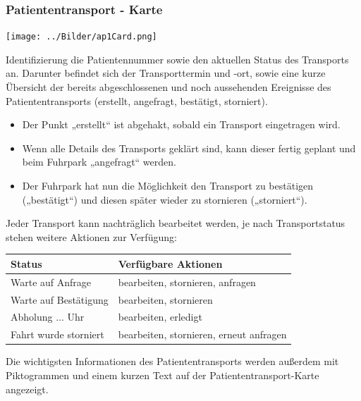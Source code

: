 \documentclass[a4paper, ngerman, 12pt]{scrartcl}
\begin{document}
\subsubsection{Patiententransport - Karte}
\begin{center}
\begin{minipage}{0.8\textwidth}
	\centering
	\texttt{[image: ../Bilder/ap1Card.png]}
	\label{img:ap1card}
\end{minipage}
\end{center}
Identifizierung die Patientennummer sowie den aktuellen Status des Transports an. Darunter befindet sich der Transporttermin und -ort, sowie eine kurze Übersicht der bereits abgeschlossenen und noch aussehenden Ereignisse des Patiententransports (erstellt, angefragt, bestätigt, storniert).\\
\begin{itemize}
\item Der Punkt „erstellt“ ist abgehakt, sobald ein Transport eingetragen wird.
\item Wenn alle Details des Transports geklärt sind, kann dieser fertig geplant und beim Fuhrpark „angefragt“ werden.
\item Der Fuhrpark hat nun die Möglichkeit den Transport zu bestätigen („bestätigt“) und diesen später wieder zu stornieren („storniert“).
\end{itemize}
Jeder Transport kann nachträglich bearbeitet werden, je nach Transportstatus stehen weitere Aktionen zur Verfügung:\\
\begin{center}
\begin{tabular}{|p{}|p{}|}
\hline
\cellcolor{lightgray}\textbf{Status}	&\cellcolor{lightgray}\textbf{Verfügbare Aktionen}\\
\hline
Warte auf Anfrage	&bearbeiten, stornieren, anfragen\\
\hline
Warte auf Bestätigung	&bearbeiten, stornieren\\
\hline
Abholung ... Uhr	&bearbeiten, erledigt\\
\hline
Fahrt wurde storniert	&bearbeiten, stornieren, erneut anfragen\\
\hline
\end{tabular}
\end{center}
Die wichtigsten Informationen des Patiententransports werden außerdem mit Piktogrammen und einem kurzen Text auf der Patiententransport-Karte angezeigt.
\end{document}
